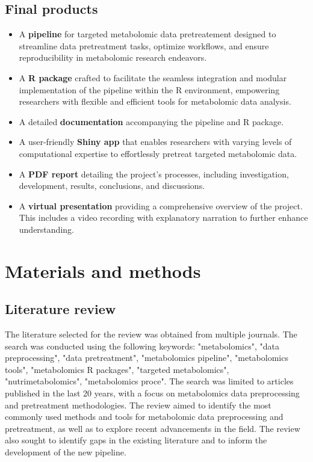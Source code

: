 \documentclass[ENG, BIB]{TFUOC}%
\begin{document}
\section{Final products}
\begin{itemize}
    \item A \textbf{pipeline} for targeted metabolomic data pretreatement designed to streamline data pretreatment tasks, optimize workflows, and ensure reproducibility in metabolomic research endeavors.
    \item A \textbf{R package} crafted to facilitate the seamless integration and modular implementation of the pipeline within the R environment, empowering researchers with flexible and efficient tools for metabolomic data analysis.
    \item A detailed \textbf{documentation} accompanying the pipeline and R package.
    \item A user-friendly \textbf{Shiny app} that enables researchers with varying levels of computational expertise to effortlessly pretreat targeted metabolomic data.
    \item A \textbf{PDF report} detailing the project's processes, including investigation, development, results, conclusions, and discussions.
    \item A \textbf{virtual presentation} providing a comprehensive overview of the project. This includes a video recording with explanatory narration to further enhance understanding.
\end{itemize}


\chapter{Materials and methods}

\section{Literature review}
The literature selected for the review was obtained from multiple journals. The search was conducted using the following keywords: "metabolomics", "data preprocessing", "data pretreatment", "metabolomics pipeline", "metabolomics tools", "metabolomics R packages", "targeted metabolomics", "nutrimetabolomics", "metabolomics proce". The search was limited to articles published in the last 20 years, with a focus on metabolomics data preprocessing and pretreatment methodologies. The review aimed to identify the most commonly used methods and tools for metabolomic data preprocessing and pretreatment, as well as to explore recent advancements in the field. The review also sought to identify gaps in the existing literature and to inform the development of the new pipeline.
\end{document}
